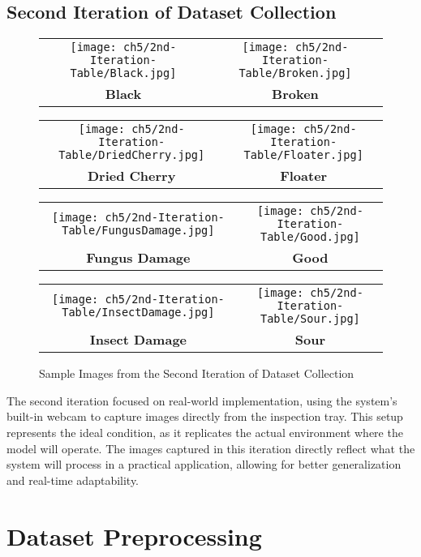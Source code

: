 \subsection{Second Iteration of Dataset Collection}
\begin{figure}[H]
	\centering
	\begin{tabular}{cc}
		\texttt{[image: ch5/2nd-Iteration-Table/Black.jpg]} &
		\texttt{[image: ch5/2nd-Iteration-Table/Broken.jpg]} \\
		\textbf{Black}  & \textbf{Broken} \\[6pt]
	\end{tabular}
	\begin{tabular}{cc}
		\texttt{[image: ch5/2nd-Iteration-Table/DriedCherry.jpg]} &
		\texttt{[image: ch5/2nd-Iteration-Table/Floater.jpg]} \\
		\textbf{Dried Cherry}  & \textbf{Floater} \\[6pt]
	\end{tabular}
	\begin{tabular}{cc}
		\texttt{[image: ch5/2nd-Iteration-Table/FungusDamage.jpg]} &
		\texttt{[image: ch5/2nd-Iteration-Table/Good.jpg]} \\
		\textbf{Fungus Damage}  & \textbf{Good} \\[6pt]
	\end{tabular}
	\begin{tabular}{cc}
		\texttt{[image: ch5/2nd-Iteration-Table/InsectDamage.jpg]} &
		\texttt{[image: ch5/2nd-Iteration-Table/Sour.jpg]} \\
		\textbf{Insect Damage}  & \textbf{Sour} \\[6pt]
	\end{tabular}
	\caption{Sample Images from the Second Iteration of Dataset Collection}
\end{figure}

The second iteration focused on real-world implementation, using the system's built-in webcam to capture images directly from the inspection tray. This setup represents the ideal condition, as it replicates the actual environment where the model will operate. The images captured in this iteration directly reflect what the system will process in a practical application, allowing for better generalization and real-time adaptability.

\section{Dataset Preprocessing}
\label{sec:dataset_prep}
